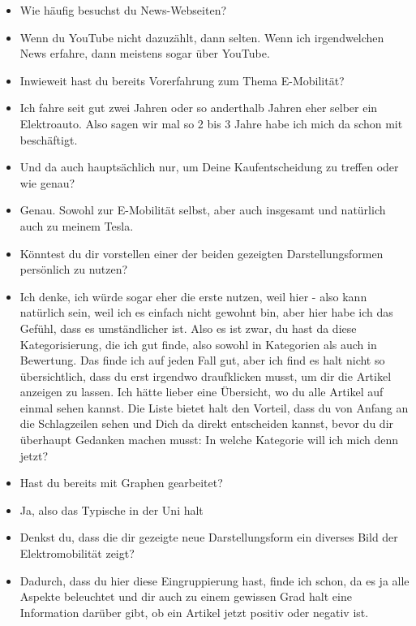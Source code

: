 {\begin{itemize}[]
    Aber nicht nur vertikal, sondern auch horizontal angeordnet.
    Ähnlich wie auf der YouTube-Startseite.
    Also ebenfalls mit Kategorien beziehungsweise Rubriken.
    Und dann halt typische Internetforen.
    \item {} Wie häufig besuchst du News-Webseiten?
    \item {} Wenn du YouTube nicht dazuzählt, dann selten.
    Wenn ich irgendwelchen News erfahre, dann meistens sogar über YouTube.
    \item {} Inwieweit hast du bereits Vorerfahrung zum Thema E-Mobilität?
    \item {} Ich fahre seit gut zwei Jahren oder so anderthalb Jahren eher selber ein Elektroauto.
    Also sagen wir mal so 2 bis 3 Jahre habe ich mich da schon mit beschäftigt. 
    \item {} Und da auch hauptsächlich nur, um Deine Kaufentscheidung zu treffen oder wie genau?
    \item {} Genau. 
    Sowohl zur E-Mobilität selbst, aber auch insgesamt und natürlich auch zu meinem Tesla.
    \item {} Könntest du dir vorstellen einer der beiden gezeigten Darstellungsformen persönlich zu nutzen?
    \item {} Ich denke, ich würde sogar eher die erste nutzen, weil hier - also kann natürlich sein, weil ich es einfach nicht gewohnt bin, aber hier habe ich das Gefühl, dass es umständlicher ist.
    Also es ist zwar, du hast da diese Kategorisierung, die ich gut finde, also sowohl in Kategorien als auch in Bewertung.
    Das finde ich auf jeden Fall gut, aber ich find es halt nicht so übersichtlich, dass du erst irgendwo draufklicken musst, um dir die Artikel anzeigen zu lassen.
    Ich hätte lieber eine Übersicht, wo du alle Artikel auf einmal sehen kannst.
    Die Liste bietet halt den Vorteil, dass du von Anfang an die Schlagzeilen sehen und Dich da direkt entscheiden kannst, bevor du dir überhaupt Gedanken machen musst: In welche Kategorie will ich mich denn jetzt?
    \item {} Hast du bereits mit Graphen gearbeitet?
    \item {} Ja, also das Typische in der Uni halt
    \item {} Denkst du, dass die dir gezeigte neue Darstellungsform ein diverses Bild der Elektromobilität zeigt?
    \item {} Dadurch, dass du hier diese Eingruppierung hast, finde ich schon, da es ja alle Aspekte beleuchtet und dir auch zu einem gewissen Grad halt eine Information darüber gibt, ob ein Artikel jetzt positiv oder negativ ist.

\end{itemize}}
